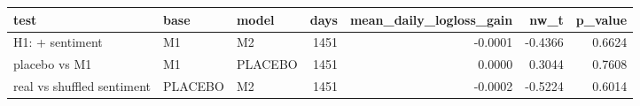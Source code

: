 \begin{tabular}{lllrrrr}
\toprule
test & base & model & days & mean\_daily\_logloss\_gain & nw\_t & p\_value \\
\midrule
H1: + sentiment & M1 & M2 & 1451 & -0.0001 & -0.4366 & 0.6624 \\
placebo vs M1 & M1 & PLACEBO & 1451 & 0.0000 & 0.3044 & 0.7608 \\
real vs shuffled sentiment & PLACEBO & M2 & 1451 & -0.0002 & -0.5224 & 0.6014 \\
\bottomrule
\end{tabular}

